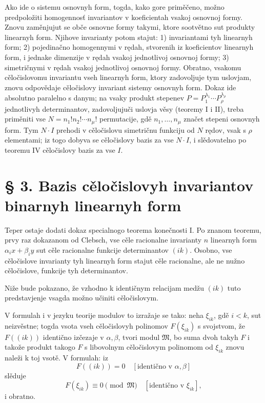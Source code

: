 \documentclass[11pt]{article}
\providecommand{\frM}{\mathfrak M}
\begin{document}
Ako ide o sistemu osnovnyh form, togda, kako gore priměčeno, možno predpoložiti homogennosť invariantov v koeficientah vsakoj osnovnoj formy. Znovu zaměnjujut se obče osnovne formy takymi, ktore sootvětno sut produkty linearnyh form. Njihove invarianty potom stajut: 1) invariantami tyh linearnyh form; 2) pojedinačno homogennymi v rędah, stvorenih iz koeficientov linearnyh form, i jednake dimenzije v rędah vsakoj jednotlivoj osnovnoj formy; 3) simetričnymi v rędah vsakoj jednotlivoj osnovnoj formy. Obratno, vsakomu cěločislovomu invariantu vseh linearnyh form, ktory zadovoljuje tym uslovjam, znovu odpovědaje cěločislovy invariant sistemy osnovnyh form. Dokaz ide absolutno paralelno s danym; na vsaky produkt stepenev \(P=P_1^{\lambda_1}\cdots P_\rho^{\lambda_\rho}\) jednotlivyh determinantov, zadovoljujuči uslovja věsy (teoremy I i II), treba priměniti vse \(N=n_1!n_2!\cdots n_\mu!\) permutacije, gdě \(n_1,\ldots,n_\mu\) značet stepeni osnovnyh form. Tym \(N\cdot I\) prehodi v cěločislovu simetričnu funkciju od \(N\) rędov, vsak s \(\rho\) elementami; iz togo dobyva se cěločislovy bazis za vse \(N\cdot I\), i slědovatelno po teoremu IV cěločislovy bazis za vse \(I\).

\setcounter{equation}{0}
\section*{§ 3. Bazis cěločislovyh invariantov binarnyh linearnyh form}

Teper ostaje dodati dokaz specialnogo teorema konečnosti I. Po znanom teoremu, prvy raz dokazanom od Clebsch, vse cěle racionalne invarianty \(n\) linearnyh form \(\alpha_i x+\beta_i y\) sut cěle racionalne funkcije determinantov \((ik)\). Osobno, vse cěločislove invarianty tyh linearnyh form stajut cěle racionalne, ale ne nužno cěločislove, funkcije tyh determinantov.

Niže bude pokazano, že vzhodno k identičnym relacijam medžu \((ik)\) tuto predstavjenje vsagda možno učiniti cěločislovym.

V formulah i v jezyku teorije modulov to izražaje se tako: neha \(\xi_{ik}\), gdě \(i<k\), sut neizvěstne; togda vsota vseh cěločislovyh polinomov \(F(\xi_{ik})\) s svojstvom, že \(F((ik))\) identično izčezaje v \(\alpha,\beta\), tvori modul \(\frM\), bo suma dvoh takyh \(F\) i takože produkt takogo \(F\) s libovolnym cěločislovym polinomom od \(\xi_{ik}\) znovu naleži k toj vsotě. V formulah: iz
\[
        F((ik))=0\quad [\text{identično v \(\alpha,\beta\)}]
\]
slěduje
\[
        F(\xi_{ik})\equiv0\pmod{\frM}\quad [\text{identično v \(\xi_{ik}\)}],
\]
i obratno.
\end{document}
